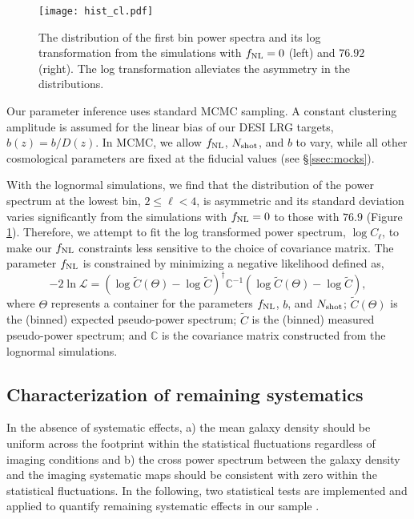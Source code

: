 \begin{figure}
\centering
\texttt{[image: hist\_cl.pdf]}
\caption{The distribution of the first bin power spectra and its log transformation from the simulations with $f_{\rm NL}=0$ (left) and $76.92$ (right). The log transformation alleviates the asymmetry in the distributions.}\label{fig:histcell}
\end{figure}

Our parameter inference uses standard MCMC sampling. A constant clustering amplitude is assumed for the linear bias of our DESI LRG targets, $b(z) = b/D(z)$. In MCMC, we allow $f_{\rm NL}$, $N_{\rm shot}$, and $b$ to vary, while all other cosmological parameters are fixed at the fiducial values (see \S \ref{ssec:mocks}). 

With the lognormal simulations, we find that the distribution of the power spectrum at the lowest bin, $2\leq \ell < 4$, is asymmetric and its standard deviation varies significantly from the simulations with $f_{\rm NL}=0$ to those with $76.9$ (Figure \ref{fig:histcell}). Therefore, we attempt to fit the log transformed power spectrum, $\log C_{\ell}$, to make our $f_{\rm NL}$ constraints less sensitive to the choice of covariance matrix. The parameter $f_{\rm NL}$ is constrained by minimizing a negative likelihood defined as,
\begin{equation}
-2\ln\mathcal{L} = (\log \tilde{C}(\Theta)-\log \tilde{C})^{\dagger} \mathbb{C}^{-1} (\log \tilde{C}(\Theta)-\log \tilde{C}),
\end{equation}
where $\Theta$ represents a container for the parameters $f_{\rm NL}$, $b$, and $N_{\rm shot}$; $\tilde{C}(\Theta)$ is the (binned) expected pseudo-power spectrum; $\tilde{C}$ is the (binned) measured pseudo-power spectrum; and $\mathbb{C}$ is the covariance matrix constructed from the lognormal simulations.  


\subsection{Characterization of remaining systematics}
\label{ssec:characterization}
In the absence of systematic effects, a) the mean galaxy density should be uniform across the footprint within the statistical fluctuations regardless of imaging conditions and b) the cross power spectrum between the galaxy density and the imaging systematic maps should be consistent with zero within the statistical fluctuations. In the following, two statistical tests are implemented and applied to quantify remaining systematic effects in our sample \cite[see, also,][]{rezaie2021primordial}.

